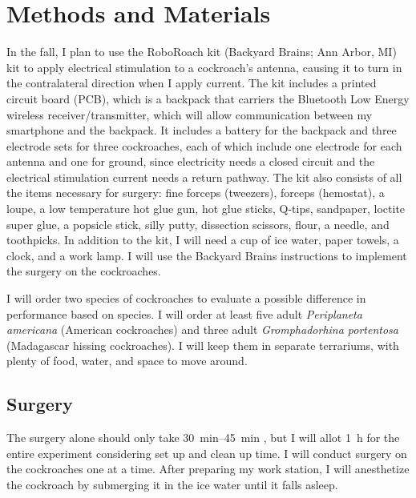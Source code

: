 \section{Methods and Materials}
\label{sec:methods}



In the fall, I plan to use the RoboRoach kit (Backyard Brains; Ann Arbor, MI) kit to apply electrical stimulation to a cockroach's antenna, causing it to turn in the contralateral direction when I apply current. The kit includes a printed circuit board (PCB), which is a backpack that carriers the Bluetooth Low Energy wireless receiver/transmitter, which will allow communication between my smartphone and the backpack. It includes a battery for the backpack and three electrode sets for three cockroaches, each of which include one electrode for each antenna and one for ground, since electricity needs a closed circuit and the electrical stimulation current needs a return pathway. The kit also consists of all the items necessary for surgery: fine forceps (tweezers), forceps (hemostat), a loupe, a low temperature hot glue gun, hot glue sticks, Q-tips, sandpaper, loctite super glue, a popsicle stick, silly putty, dissection scissors, flour, a needle, and toothpicks. In addition to the kit, I will need a cup of ice water, paper towels, a clock, and a work lamp. I will use the Backyard Brains instructions to implement the surgery on the cockroaches.

I will order two species of cockroaches to evaluate a possible difference in performance based on species. I will order at least five adult \emph{Periplaneta americana} (American cockroaches) and three adult \emph{Gromphadorhina portentosa} (Madagascar hissing cockroaches). I will keep them in separate terrariums, with plenty of food, water, and space to move around.

\subsection{Surgery}

The surgery alone should only take \SIrange{30}{45}{\minute} , but I will allot \SI{1}{\hour} for the entire experiment considering set up and clean up time. I will conduct surgery on the cockroaches one at a time. After preparing my work station, I will anesthetize the cockroach by submerging it in the ice water until it falls asleep. 


